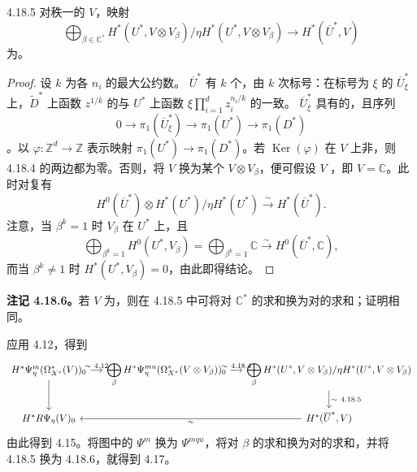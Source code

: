 \begin{SGAresult}{}{4.18.5}
对秩一的 $V$，映射
\[
 \bigoplus_{\beta\in\mathbb C^*}
 H^*(U^*,V\otimes V_\beta)/\eta H^*(U^*,V\otimes V_\beta)
 \longrightarrow H^*(\overline U^*,V)
\]
为。
\end{SGAresult}
\begin{proof}
设 $k$ 为各 $n_i$ 的最大公约数。 $\overline U^*$ 有 $k$ 个，由 $k$ 次标号：在标号为 $\xi$ 的 $\overline U_\xi^*$ 上，$\widetilde D^*$ 上函数 $z^{1/k}$ 的与 $U^*$ 上函数 $\xi\prod_{i=1}^dz_i^{n_i/k}$ 的一致。 $\overline U_\xi^*$ 具有的，且序列
\[
 0\longrightarrow\pi_1(\overline U_\xi^*)\longrightarrow\pi_1(U^*)\longrightarrow\pi_1(D^*)
\]
。以 $\varphi:\mathbb Z^d\to\mathbb Z$ 表示映射 $\pi_1(U^*)\to\pi_1(D^*)$。若 $\operatorname{Ker}(\varphi)$ 在 $V$ 上非，则 4.18.4 的两边都为零。否则，将 $V$ 换为某个 $V\otimes V_\beta$，便可假设 $V$ ，即 $V=\mathbb C$。此时对复有
\[
 H^0(\overline U^*)\otimes H^*(U^*)/\eta H^*(U^*)\xrightarrow{\sim}H^*(\overline U^*).
\]
注意，当 $\beta^k=1$ 时 $V_\beta$ 在 $U^*$ 上，且
\[
 \bigoplus_{\beta^k=1}H^0(U^*,V_\beta)=\bigoplus_{\beta^k=1}\mathbb C
 \xrightarrow{\sim}H^0(\overline U^*,\mathbb C),
\]
而当 $\beta^k\neq1$ 时 $H^*(U^*,V_\beta)=0$，由此即得结论。
\end{proof}

\textbf{注记 4.18.6。}若 $V$ 为，则在 4.18.5 中可将对 $\mathbb C^*$ 的求和换为对的求和；证明相同。

应用 4.12，得到
\[
\begin{tikzcd}[column sep=small]
 H^*\Psi_\eta^m(\Omega_{X^*}^*(V))_0\arrow[r,"\sim\ 4.12"]\arrow[d]&
 \displaystyle\bigoplus_\beta H^*\Psi_\eta^{mu}(\Omega_{X^*}^*(V\otimes V_\beta))_0\arrow[r,"\sim\ 4.18.4"]&
 \displaystyle\bigoplus_\beta H^*(U^*,V\otimes V_\beta)/\eta H^*(U^*,V\otimes V_\beta)\arrow[d,"\sim\ 4.18.5"]\\
 H^*R\Psi_\eta(V)_0&&H^*(\overline U^*,V)\arrow[ll,"\sim"]
\end{tikzcd}
\]
由此得到 4.15。将图中的 $\Psi^m$ 换为 $\Psi^{mqu}$，将对 $\beta$ 的求和换为对的求和，并将 4.18.5 换为 4.18.6，就得到 4.17。

